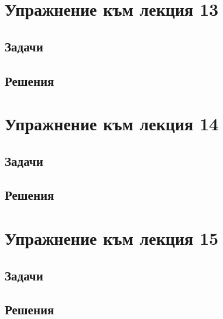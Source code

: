 \documentclass[a4paper,fleqn,12pt]{article}
\theoremstyle{definition}
\begin{document}
\newpage 
\section{Упражнение към лекция 13}

\subsection{Задачи}

\newpage
\subsection{Решения}

\newpage 
\section{Упражнение към лекция 14}

\subsection{Задачи}

\newpage
\subsection{Решения}

\newpage 
\section{Упражнение към лекция 15}

\subsection{Задачи}

\newpage
\subsection{Решения}
\end{document}
